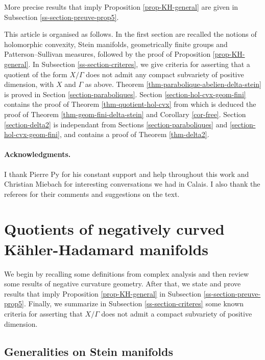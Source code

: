 \documentclass{article}
\theoremstyle{definition}
\theoremstyle{remark}
\begin{document}
	\noindent More precise results that imply Proposition \ref{prop-KH-general} are given in Subsection \ref{ss-section-preuve-prop5}.
	
	This article is organised as follows. In the first section are recalled the notions of holomorphic convexity, Stein manifolds, geometrically finite groups and Patterson--Sullivan measures, followed by the proof of Proposition \ref{prop-KH-general}. In Subsection \ref{ss-section-criteres}, we give criteria for asserting that a quotient of the form $X/\Gamma$ does not admit any compact subvariety of positive dimension, with $X$ and $\Gamma$ as above. Theorem \ref{thm-parabolique-abelien-delta-stein} is proved in Section \ref{section-paraboliques}. Section \ref{section-hol-cvx-geom-fini} contains the proof of Theorem \ref{thm-quotient-hol-cvx} from which is deduced the proof of Theorem \ref{thm-geom-fini-delta-stein} and Corollary \ref{cor-free}. Section \ref{section-delta2} is independant from Sections \ref{section-paraboliques} and \ref{section-hol-cvx-geom-fini}, and contains a proof of Theorem \ref{thm-delta2}.
	
	\paragraph{Acknowledgments.} I thank Pierre Py for his constant support and help throughout this work and Christian Miebach for interesting conversations we had in Calais. I also thank the referees for their comments and suggestions on the text.
	
	\tableofcontents
	
	\section{Quotients of negatively curved Kähler-Hadamard manifolds}\label{section-kahler-hadamard}

	We begin by recalling some definitions from complex analysis and then review some results of negative curvature geometry. After that, we state and prove results that imply Proposition \ref{prop-KH-general} in Subsection \ref{ss-section-preuve-prop5}. Finally, we summarize in Subsection \ref{ss-section-criteres} some known criteria for asserting that $X/\Gamma$ does not admit a compact subvariety of positive dimension.
	
	\subsection{Generalities on Stein manifolds}\label{ss-section-stein}
	
\end{document}
